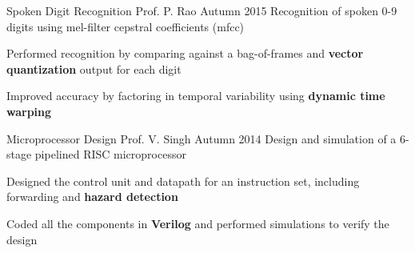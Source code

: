 \begin{cventries}
{\begin{cvitems}
    \end{cvitems}
}
%
\acadprojectentry
{Spoken Digit Recognition} %
{Prof. P. Rao} %
{Autumn 2015} %
{Recognition of spoken 0-9 digits using mel-filter cepstral coefficients (mfcc)} %
{ %
    \begin{cvitems} 
        \item {Performed recognition by comparing against a bag-of-frames and \textbf{vector quantization} output for each digit}
        \item {Improved accuracy by factoring in temporal variability using \textbf{dynamic time warping}}
    \end{cvitems}
}
\acadprojectentry
{Microprocessor Design}
{Prof. V. Singh}
{Autumn 2014}
{Design and simulation of a 6-stage pipelined RISC microprocessor}
{
\begin{cvitems}
\item{Designed the control unit and datapath for an instruction set, including forwarding and \textbf{hazard detection}}
\item{Coded all the components in \textbf{Verilog} and performed simulations to verify the design}
\end{cvitems}
}
\end{cventries}